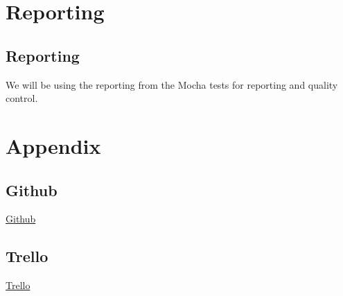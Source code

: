 \documentclass{article}
\begin{document}
\section{Reporting}
   	\subsection{Reporting}
		We will be using the reporting from the Mocha tests for reporting and quality control.
  
\section{Appendix}
	\subsection{Github}
		\href{https://github.com/KobusMarais/Cerebero}{Github}
	\subsection{Trello}
		\href{https://trello.com/b/WXh8cJZQ/demo-2}{Trello}
\end{document}
